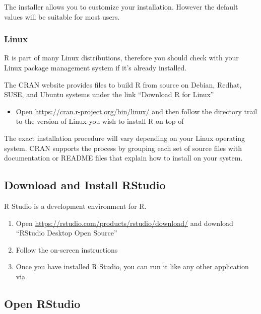\documentclass[
]{book}
\providecommand{\tightlist}{%
  \setlength{\itemsep}{0pt}\setlength{\parskip}{0pt}}
\begin{document}
The installer allows you to customize your installation. However the default values will be suitable for most users.

\hypertarget{linux}{%
\subsubsection{Linux}\label{linux}}

R is part of many Linux distributions, therefore you should check with your Linux package management system if it's already installed.

The CRAN website provides files to build R from source on Debian, Redhat, SUSE, and Ubuntu systems under the link ``Download R for Linux''

\begin{itemize}
\tightlist
\item
  Open \url{https://cran.r-project.org/bin/linux/} and then follow the directory trail to the version of Linux you wish to install R on top of
\end{itemize}

The exact installation procedure will vary depending on your Linux operating system. CRAN supports the process by grouping each set of source files with documentation or README files that explain how to install on your system.

\hypertarget{download-and-install-rstudio}{%
\subsection{Download and Install RStudio}\label{download-and-install-rstudio}}

R Studio is a development environment for R.

\begin{enumerate}
\def\labelenumi{\arabic{enumi}.}
\tightlist
\item
  Open \url{https://rstudio.com/products/rstudio/download/} and download ``RStudio Desktop Open Source''
\item
  Follow the on-screen instructions
\item
  Once you have installed R Studio, you can run it like any other application via
\end{enumerate}

\hypertarget{open-rstudio}{%
\subsection{Open RStudio}\label{open-rstudio}}
\end{document}
